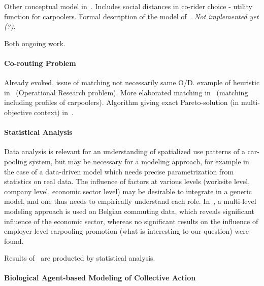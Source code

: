 Other conceptual model in~\cite{Cho2012801}. Includes social distances in co-rider choice - utility function for carpoolers. Formal description of the model of~\cite{Bellemans20121221}. \textit{Not implemented yet (?)}.

Both ongoing work.



\paragraph{Co-routing Problem}

Already evoked, issue of matching not necessarily same O/D. example of heuristic in~\cite{Knapen2012821} (Operational Research problem). More elaborated matching in~\cite{Yan2011512} (matching including profiles of carpoolers). Algorithm giving exact Pareto-solution (in multi-objective context) in~\cite{filcek2014common}.


\paragraph{Statistical Analysis}

Data analysis is relevant for an understanding of spatialized use patterns of a car-pooling system, but may be necessary for a modeling approach, for example in the case of a data-driven model which needs precise parametrization from statistics on real data. The influence of factors at various levels (worksite level, company level, economic sector level) may be desirable to integrate in a generic model, and one thus needs to empirically understand each role. In~\cite{vanoutrive2009carpooling}, a multi-level modeling approach is used on Belgian commuting data, which reveals significant influence of the economic sector, whereas no significant results on the influence of employer-level carpooling promotion (what is interesting to our question) were found.


Results of~\cite{Abrahamse201245} are producted by statistical analysis.



\paragraph{Biological Agent-based Modeling of Collective Action}

